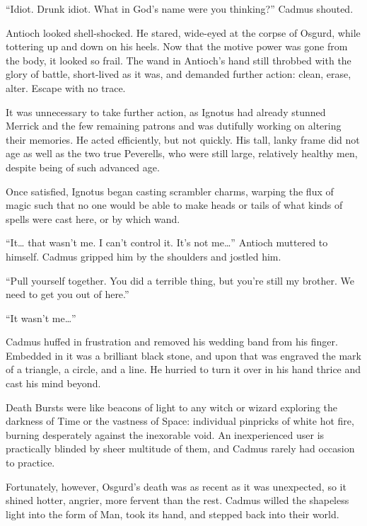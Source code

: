 
“Idiot. Drunk idiot. What in God’s name were you thinking?” Cadmus shouted.

Antioch looked shell-shocked. He stared, wide-eyed at the corpse of Osgurd, while tottering up and down on his heels. Now that the motive power was gone from the body, it looked so frail. The wand in Antioch’s hand still throbbed with the glory of battle, short-lived as it was, and demanded further action: clean, erase, alter. Escape with no trace.

It was unnecessary to take further action, as Ignotus had already stunned Merrick and the few remaining patrons and was dutifully working on altering their memories. He acted efficiently, but not quickly. His tall, lanky frame did not age as well as the two true Peverells, who were still large, relatively healthy men, despite being of such advanced age.

Once satisfied, Ignotus began casting scrambler charms, warping the flux of magic such that no one would be able to make heads or tails of what kinds of spells were cast here, or by which wand.

“It… that wasn’t me. I can’t control it. It’s not me…” Antioch muttered to himself. Cadmus gripped him by the shoulders and jostled him.

“Pull yourself together. You did a terrible thing, but you’re still my brother. We need to get you out of here.”

“It wasn’t me…”

Cadmus huffed in frustration and removed his wedding band from his finger. Embedded in it was a brilliant black stone, and upon that was engraved the mark of a triangle, a circle, and a line. He hurried to turn it over in his hand thrice and cast his mind beyond.

Death Bursts were like beacons of light to any witch or wizard exploring the darkness of Time or the vastness of Space: individual pinpricks of white hot fire, burning desperately against the inexorable void. An inexperienced user is practically blinded by sheer multitude of them, and Cadmus rarely had occasion to practice.

Fortunately, however, Osgurd’s death was as recent as it was unexpected, so it shined hotter, angrier, more fervent than the rest. Cadmus willed the shapeless light into the form of Man, took its hand, and stepped back into their world.

